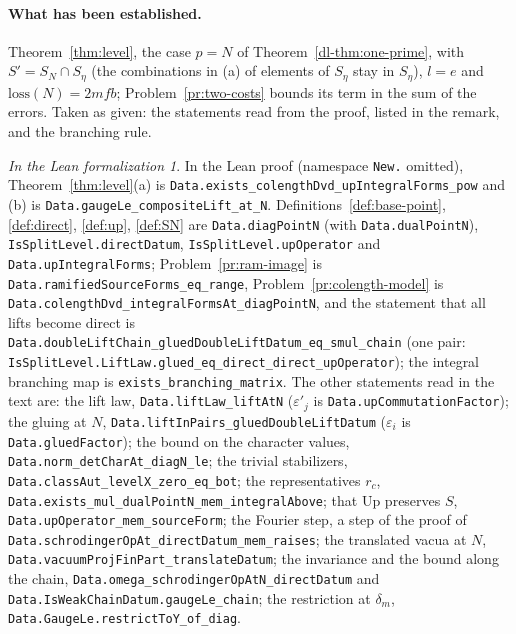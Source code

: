 \documentclass[reqno]{amsart}
\theoremstyle{plain}
\theoremstyle{definition}
\theoremstyle{remark}
\newtheorem*{leanremark}{In the Lean formalization}
\newcommand{\Up}{\mathrm{Up}}
\newcommand{\tl}[1]{\texttt{#1}}
\newcommand{\us}{\_\allowbreak}
\begin{document}
\paragraph{What has been established.}  Theorem~\ref{thm:level}, the case \(p = N\) of Theorem~\ref{dl-thm:one-prime}, with \(S' = S_N \cap S_\eta\) (the combinations in (a) of elements of \(S_\eta\) stay in \(S_\eta\)), \(l = e\) and \(\mathrm{loss}(N) = 2mfb\); Problem~\ref{pr:two-costs} bounds its term in the sum of the errors.  Taken as given: the statements read from the proof, listed in the remark, and the branching rule.

\begin{leanremark}
\begin{sloppypar}
In the Lean proof \cite{GL} (namespace \tl{New.} omitted), Theorem~\ref{thm:level}(a) is \tl{Data.exists\us colengthDvd\us upIntegralForms\us pow} and (b) is \tl{Data.gaugeLe\us compositeLift\us at\us N}.  Definitions~\ref{def:base-point}, \ref{def:direct}, \ref{def:up}, \ref{def:SN} are \tl{Data.diagPointN} (with \tl{Data.dualPointN}), \tl{IsSplitLevel.directDatum}, \tl{IsSplitLevel.upOperator} and \tl{Data.upIntegralForms}; Problem~\ref{pr:ram-image} is \tl{Data.ramifiedSourceForms\us eq\us range}, Problem~\ref{pr:colength-model} is \tl{Data.colengthDvd\us integralFormsAt\us diagPointN}, and the statement that all lifts become direct is \tl{Data.doubleLiftChain\us gluedDoubleLiftDatum\us eq\us smul\us chain} (one pair: \tl{IsSplitLevel.LiftLaw.glued\us eq\us direct\us direct\us upOperator}); the integral branching map is \tl{exists\us branching\us matrix}.  The other statements read in the text are: the lift law, \tl{Data.liftLaw\us liftAtN} (\(\varepsilon'_j\) is \tl{Data.upCommutationFactor}); the gluing at \(N\), \tl{Data.liftInPairs\us gluedDoubleLiftDatum} (\(\varepsilon_i\) is \tl{Data.gluedFactor}); the bound on the character values, \tl{Data.norm\us detCharAt\us diagN\us le}; the trivial stabilizers, \tl{Data.classAut\us levelX\us zero\us eq\us bot}; the representatives \(r_c\), \tl{Data.exists\us mul\us dualPointN\us mem\us integralAbove}; that \(\Up\) preserves \(S\), \tl{Data.upOperator\us mem\us sourceForm}; the Fourier step, a step of the proof of \tl{Data.schrodingerOpAt\us directDatum\us mem\us raises}; the translated vacua at \(N\), \tl{Data.vacuumProjFinPart\us translateDatum}; the invariance and the bound along the chain, \tl{Data.omega\us schrodingerOpAtN\us directDatum} and \tl{Data.IsWeakChainDatum.gaugeLe\us chain}; the restriction at \(\delta_m\), \tl{Data.GaugeLe.restrictToY\us of\us diag}.
\end{sloppypar}
\end{leanremark}
\end{document}
